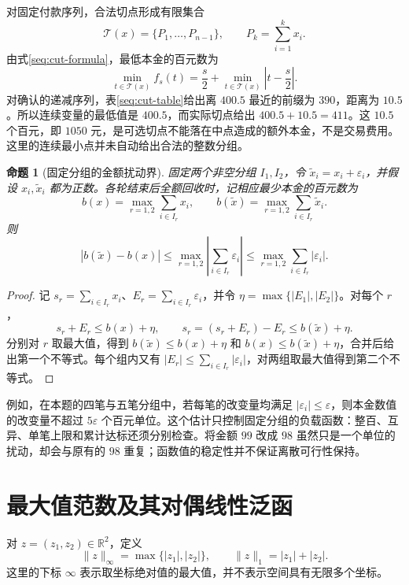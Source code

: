 \documentclass[UTF8,a4paper]{ctexbook}
\newtheorem{proposition}[theorem]{命题}
\theoremstyle{definition}
\numberwithin{equation}{chapter}
\newcommand{\1}{\mathbf{1}}
\begin{document}
对固定付款序列，合法切点形成有限集合
\[
\mathcal T(x)=\{P_1,\ldots,P_{n-1}\},
\qquad P_k=\sum_{i=1}^k x_i.
\]
由式\eqref{seq:cut-formula}，最低本金的百元数为
\begin{equation}\label{fa:discrete-cut-penalty}
\min_{t\in\mathcal T(x)}f_s(t)
=\frac{s}{2}+\min_{t\in\mathcal T(x)}\left|t-\frac{s}{2}\right|.
\end{equation}
对确认的递减序列，表\ref{seq:cut-table}给出离 $400.5$ 最近的前缀为 $390$，距离为 $10.5$。所以连续变量的最低值是 $400.5$，而实际切点给出 $400.5+10.5=411$。这 $10.5$ 个百元，即 $1050$ 元，是可选切点不能落在中点造成的额外本金，不是交易费用。这里的连续最小点并未自动给出合法的整数分组。

\begin{proposition}[固定分组的金额扰动界]\label{fa:perturbation}
固定两个非空分组 $I_1,I_2$，令 $\widetilde x_i=x_i+\varepsilon_i$，并假设 $x_i,\widetilde x_i$ 都为正数。各轮结束后全额回收时，记相应最少本金的百元数为
\[
b(x)=\max_{r=1,2}\sum_{i\in I_r}x_i,
\qquad
b(\widetilde x)=\max_{r=1,2}\sum_{i\in I_r}\widetilde x_i.
\]
则
\begin{equation}\label{fa:perturbation-bound}
|b(\widetilde x)-b(x)|
\le\max_{r=1,2}\left|\sum_{i\in I_r}\varepsilon_i\right|
\le\max_{r=1,2}\sum_{i\in I_r}|\varepsilon_i|.
\end{equation}
\end{proposition}
\begin{proof}
记 $s_r=\sum_{i\in I_r}x_i$、$E_r=\sum_{i\in I_r}\varepsilon_i$，并令 $\eta=\max\{|E_1|,|E_2|\}$。对每个 $r$，
\[
s_r+E_r\le b(x)+\eta,
\qquad
s_r=(s_r+E_r)-E_r\le b(\widetilde x)+\eta.
\]
分别对 $r$ 取最大值，得到 $b(\widetilde x)\le b(x)+\eta$ 和 $b(x)\le b(\widetilde x)+\eta$，合并后给出第一个不等式。每个组内又有 $|E_r|\le\sum_{i\in I_r}|\varepsilon_i|$，对两组取最大值得到第二个不等式。
\end{proof}

例如，在本题的四笔与五笔分组中，若每笔的改变量均满足 $|\varepsilon_i|\le\varepsilon$，则本金数值的改变量不超过 $5\varepsilon$ 个百元单位。这个估计只控制固定分组的负载函数：整百、互异、单笔上限和累计达标还须分别检查。将金额 $99$ 改成 $98$ 虽然只是一个单位的扰动，却会与原有的 $98$ 重复；函数值的稳定性并不保证离散可行性保持。

\section{最大值范数及其对偶线性泛函}

对 $z=(z_1,z_2)\in\mathbb R^2$，定义
\[
\lVert z\rVert_\infty=\max\{|z_1|,|z_2|\},
\qquad
\lVert z\rVert_1=|z_1|+|z_2|.
\]
这里的下标 $\infty$ 表示取坐标绝对值的最大值，并不表示空间具有无限多个坐标。
\end{document}
